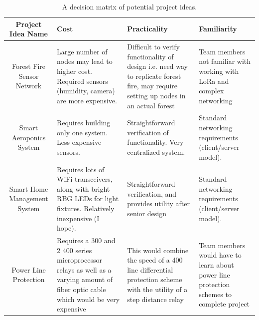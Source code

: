 \documentclass[titlepage, 11pt, letterpaper]{article}
\begin{document}
\begin{table}[H]
    \centering
    
    \begin{tabularx}{\linewidth}{|c|X|X|X|}
        \hline
        Project Idea Name & Cost & Practicality & Familiarity \\
        \hline
        Forest Fire Sensor Network &
        Large number of nodes may lead to higher cost. Required sensors (humidity, camera) are more expensive. &
        Difficult to verify functionality of design i.e. need way to replicate forest fire, may require setting up nodes in an actual forest &
        Team members not familiar with working with LoRa and complex networking \\\hline
        
        Smart Aeroponics System &
        Requires building only one system. Less expensive sensors. &
        Straightforward verification of functionality. Very centralized system. &
        Standard networking requirements (client/server model). \\\hline
        
        Smart Home Management System 
        & Requires lots of WiFi transceivers, along with bright RBG LEDs for light fixtures. Relatively inexpensive (I hope).
        & Straightforward verification, and provides utility after senior design
        & Standard networking requirements (client/server model).
        \\\hline
        
        Power Line Protection 
        & Requires a 300 and 2 400 series microprocessor relays as well as a varying amount of fiber optic cable which would be very expensive
        & This would combine the speed of a 400 line differential protection scheme with the utility of a step distance relay
        & Team members would have to learn about power line protection schemes to complete project
        \\\hline
        
    \end{tabularx}
    \caption{A decision matrix of potential project ideas.}
\end{table}
\end{document}
